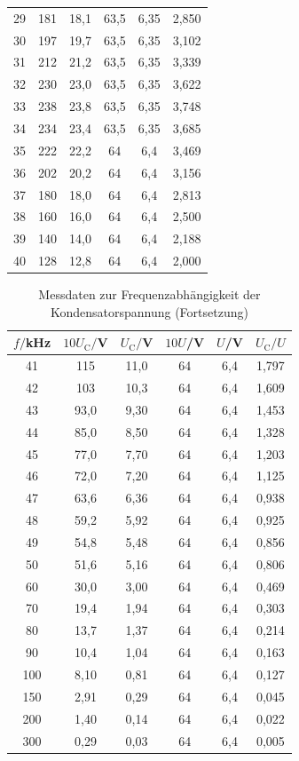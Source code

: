 \begin{table}
\begin{tabular}{c c c c c c}
 29	  & 181	   & 18,1  & 63,5 & 6,35& 2,850 \\
 30	  & 197	   & 19,7  & 63,5 & 6,35& 3,102 \\
 31	  & 212	   & 21,2  & 63,5 & 6,35& 3,339 \\
 32	  & 230	   & 23,0  & 63,5 & 6,35& 3,622 \\
 33	  & 238	   & 23,8  & 63,5 & 6,35& 3,748 \\
 34	  & 234	   & 23,4  & 63,5 & 6,35& 3,685 \\
 35	  & 222	   & 22,2  & 64   & 6,4 & 3,469 \\
 36	  & 202	   & 20,2  & 64   & 6,4 & 3,156 \\
 37	  & 180	   & 18,0  & 64   & 6,4 & 2,813 \\
 38	  & 160	   & 16,0  & 64   & 6,4 & 2,500 \\
 39	  & 140	   & 14,0  & 64   & 6,4 & 2,188 \\
 40	  & 128	   & 12,8  & 64   & 6,4 & 2,000 \\
\bottomrule
\end{tabular}
\end{table}

\begin{table}
\centering
\caption{Messdaten zur Frequenzabhängigkeit der Kondensatorspannung (Fortsetzung)}
\label{tab:amplitude2}
\begin{tabular}{c c c c c c}
\toprule
$f/$kHz & $10U_\mathrm{C}/$V & $U_\mathrm{C}/$V & $10U$/V & $U$/V & $U_\mathrm{C}/U$ \\
\midrule
 41	  & 115	   & 11,0    & 64   & 6,4 & 1,797 \\
 42	  & 103	   & 10,3  & 64   & 6,4 & 1,609 \\
 43	  &  93,0	 &  9,30 & 64   & 6,4 & 1,453 \\
 44	  &  85,0	 &  8,50 & 64   & 6,4 & 1,328 \\
 45	  &  77,0	 &  7,70 & 64   & 6,4 & 1,203 \\
 46	  &  72,0	 &  7,20 & 64   & 6,4 & 1,125 \\
 47	  &  63,6  &  6,36 & 64   & 6,4 & 0,938 \\
 48	  &  59,2  &  5,92 & 64   & 6,4 & 0,925 \\
 49	  &  54,8	 &  5,48 & 64   & 6,4 & 0,856 \\
 50	  &  51,6	 &  5,16 & 64   & 6,4 & 0,806 \\
 60	  &  30,0	 &  3,00 & 64   & 6,4 & 0,469 \\
 70	  &  19,4	 &  1,94 & 64   & 6,4 & 0,303 \\
 80	  &  13,7	 &  1,37 & 64   & 6,4 & 0,214 \\
 90	  &  10,4	 &  1,04 & 64   & 6,4 & 0,163 \\
100 	&   8,10 &  0,81 & 64   & 6,4 & 0,127 \\
150	  &   2,91 &	0,29 & 64   & 6,4 & 0,045 \\
200	  &   1,40 &  0,14 & 64   & 6,4 & 0,022 \\
300	  &   0,29 &	0,03 & 64   & 6,4 & 0,005 \\
\bottomrule
\end{tabular}
\end{table}

